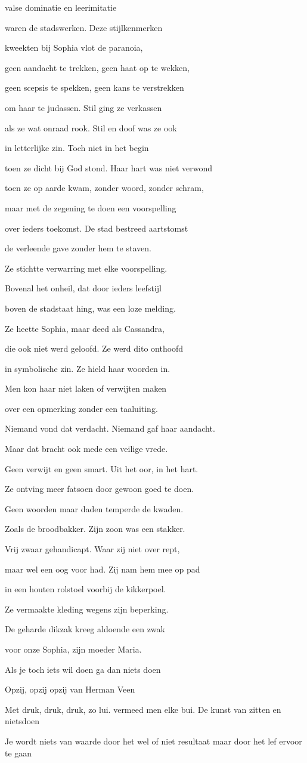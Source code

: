 valse dominatie
en leerimitatie

waren de stadswerken.
Deze stijlkenmerken

kweekten bij Sophia
vlot de paranoia,

geen aandacht te trekken,
geen haat op te wekken,

geen scepsis te spekken,
geen kans te verstrekken

om haar te judassen.
Stil ging ze verkassen

als ze wat onraad rook.
Stil en doof was ze ook

in letterlijke zin.
Toch niet in het begin

toen ze dicht bij God stond.
Haar hart was niet verwond

toen ze op aarde kwam,
zonder woord, zonder schram,

maar met de zegening
te doen een voorspelling

over ieders toekomst.
De stad bestreed aartstomst

de verleende gave
zonder hem te staven.

Ze stichtte verwarring
met elke voorspelling.

Bovenal het onheil,
dat door ieders leefstijl

boven de stadstaat hing,
was een loze melding.

Ze heette Sophia,
maar deed als Cassandra,

die ook niet werd geloofd.
Ze werd dito onthoofd

in symbolische zin.
Ze hield haar woorden in.

Men kon haar niet laken
of verwijten maken

over een opmerking
zonder een taaluiting.

Niemand vond dat verdacht.
Niemand gaf haar aandacht.

Maar dat bracht ook mede
een veilige vrede.

Geen verwijt en geen smart.
Uit het oor, in het hart.

Ze ontving meer fatsoen
door gewoon goed te doen.

Geen woorden maar daden
temperde de kwaden.

Zoals de broodbakker.
Zijn zoon was een stakker.

Vrij zwaar gehandicapt.
Waar zij niet over rept,

maar wel een oog voor had.
Zij nam hem mee op pad

in een houten rolstoel
voorbij de kikkerpoel.

Ze vermaakte kleding
wegens zijn beperking.

De geharde dikzak
kreeg aldoende een zwak

voor onze Sophia,
zijn moeder Maria.

Als je toch iets wil doen ga dan niets doen

Opzij, opzij opzij van Herman Veen

Met druk, druk, druk, zo lui.
vermeed men elke bui.
De kunst van zitten en nietsdoen

Je wordt niets van waarde door het wel of niet resultaat maar door het lef ervoor te gaan
